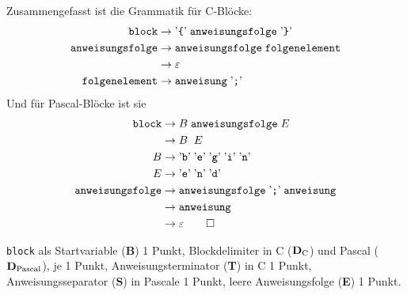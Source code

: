 \begin{loesung}
Zusammengefasst ist die Grammatik für C-Blöcke:
\begin{align*}
\texttt{block}
&\rightarrow
\text{'{\tt \{}'}\;\texttt{anweisungsfolge}\; \text{'{\tt\}}'}
\\
\texttt{anweisungsfolge}
&\rightarrow
\texttt{anweisungsfolge}
\;
\texttt{folgenelement}
\\
&\rightarrow\varepsilon
\\
\texttt{folgenelement}
&\rightarrow 
\texttt{anweisung}
\;\text{'{\tt ;}'}
\end{align*}
Und für Pascal-Blöcke ist sie
\begin{align*}
\texttt{block}
&\rightarrow
B\; \texttt{anweisungsfolge}\;E
\\
&\rightarrow
B\; \;E
\\
B&\rightarrow
\text{'}\texttt{b}\text{'}\;
\text{'}\texttt{e}\text{'}\;
\text{'}\texttt{g}\text{'}\;
\text{'}\texttt{i}\text{'}\;
\text{'}\texttt{n}\text{'}
\\
E&\rightarrow
\text{'}\texttt{e}\text{'}\;
\text{'}\texttt{n}\text{'}\;
\text{'}\texttt{d}\text{'}
\\
\texttt{anweisungsfolge}
&\rightarrow
\texttt{anweisungsfolge} \; \text{'{\tt ;}'}\; \texttt{anweisung}
\\
&\rightarrow\texttt{anweisung}
\\
&\rightarrow\varepsilon
\qedhere
\end{align*}
\end{loesung}

\begin{bewertung}
\texttt{block} als Startvariable ({\bf B}) 1 Punkt,
Blockdelimiter in C ($\text{{\bf D}}_{\text{C}}$)
und Pascal ($\text{{\bf D}}_{\text{Pascal}}$), je 1 Punkt,
Anweisungsterminator ({\bf T}) in C 1 Punkt,
Anweisungsseparator ({\bf S}) in Pascale 1 Punkt,
leere Anweisungsfolge ({\bf E}) 1 Punkt.
\end{bewertung}
